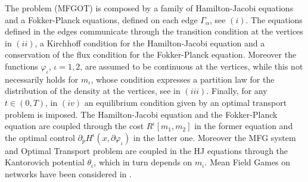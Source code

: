 \documentclass[smallextended,referee,envcountsect,]{svjour3}
\newcommand{\G}{\Gamma}
\renewcommand{\phi}{\varphi}
\renewcommand{\a}{{\alpha}}
\renewcommand{\th}{\theta}
\begin{document}
The problem (MFGOT) is composed by a family of  Hamilton-Jacobi equations and a Fokker-Planck equations, defined on each edge $\G_\a$, see $(i)$. 
The equations defined  in the edges communicate through the transition condition at the vertices in $(ii)$, a Kirchhoff condition for the Hamilton-Jacobi equation and a conservation of the flux condition for the Fokker-Planck equation. Moreover the functions $\phi_\iota$, $\iota=1,2$, are assumed to be continuous at the vertices, while this not necessarily holds for $m_\iota$, whose condition expresses a partition law for the distribution of the density at the vertices,  see in $(iii)$. Finally, for any $t\in (0,T)$, in $(iv)$ an equilibrium condition given by an optimal transport problem is imposed. 
The Hamilton-Jacobi equation and the Fokker-Planck equation are coupled through the cost $R^\iota[m_1,m_2]$ in the former equation and the optimal control $\partial_pH^\iota(x, \partial\phi_\iota)$ in the latter one. Moreover the MFG system and Optimal Transport problem are coupled in the HJ equations through the Kantorovich potential $\th_\iota$, which in turn depends on $m_\iota$. 
Mean Field Games on networks have been considered in \cite{achdou,camillimarchi_sicon,camillimarchi}.
\end{document}
